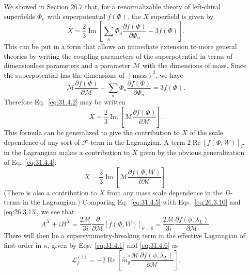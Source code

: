 We showed in Section 26.7 that, for a renormalizable theory of left-chiral
superfields \(\Phi_n\) with superpotential \(f(\Phi)\), the \(X\) superfield
is given by
\begin{equation}
  X=\frac23\operatorname{Im}
  \left[
    \sum_n\Phi_n\frac{\partial f(\Phi)}{\partial\Phi_n}
    -3f(\Phi)
  \right].
  \tag{31.4.2}\label{eq:31.4.2}
\end{equation}
This can be put in a form that allows an immediate extension to more
general theories by writing the coupling parameters of the superpotential
in terms of dimensionless parameters and a parameter \(\mathcal M\) with
the dimensions of mass. Since the superpotential has the dimensions of
\((\mathrm{mass})^3\), we have
\begin{equation}
  \mathcal M\frac{\partial f(\Phi)}{\partial\mathcal M}
  +\sum_n\Phi_n\frac{\partial f(\Phi)}{\partial\Phi_n}
  =3f(\Phi).
  \tag{31.4.3}\label{eq:31.4.3}
\end{equation}
Therefore Eq.~\eqref{eq:31.4.2} may be written
\begin{equation}
  X=\frac23\operatorname{Im}
  \left[
    \mathcal M\frac{\partial f(\Phi)}{\partial\mathcal M}
  \right].
  \tag{31.4.4}\label{eq:31.4.4}
\end{equation}
This formula can be generalized to give the contribution to \(X\) of the
scale dependence of any sort of \(\mathcal F\)-term in the Lagrangian. A
term \(2\operatorname{Re}[f(\Phi,W)]_{\mathcal F}\) in the Lagrangian makes
a contribution to \(X\) given by the obvious generalization of
Eq.~\eqref{eq:31.4.4}:
\begin{equation}
  X=\frac23\operatorname{Im}
  \left[
    \mathcal M\frac{\partial f(\Phi,W)}{\partial\mathcal M}
  \right].
  \tag{31.4.5}\label{eq:31.4.5}
\end{equation}
(There is also a contribution to \(X\) from any mass scale dependence in
the \(D\)-terms in the Lagrangian.) Comparing Eq.~\eqref{eq:31.4.5} with
Eqs.~\eqref{eq:26.3.10} and \eqref{eq:26.3.13}, we see that
\begin{equation}
  A^X+iB^X
  =\frac{2\mathcal M}{3i}\frac{\partial}{\partial\mathcal M}
   [f(\Phi,W)]_{\theta=0}
  =\frac{2\mathcal M}{3i}
   \frac{\partial f(\phi,\lambda_L)}{\partial\mathcal M}.
  \tag{31.4.6}\label{eq:31.4.6}
\end{equation}
There will then be a supersymmetry-breaking term in the effective
Lagrangian of first order in \(\kappa\), given by
Eqs.~\eqref{eq:31.4.1} and \eqref{eq:31.4.6} as
\begin{equation}
  \mathcal L_f^{(1)}
  =-2\operatorname{Re}
  \left[
    \widetilde m_g^*
    \frac{\mathcal M\,\partial f(\phi,\lambda_L)}
         {\partial\mathcal M}
  \right].
  \tag{31.4.7}\label{eq:31.4.7}
\end{equation}

